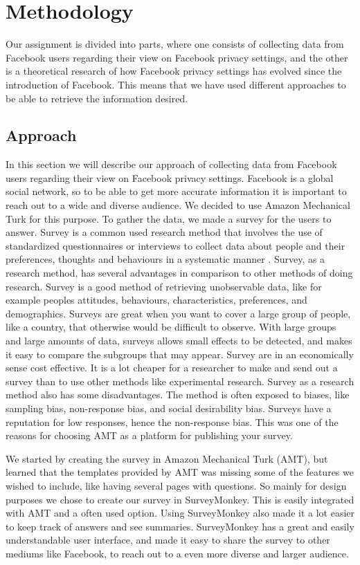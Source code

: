 \chapter{Methodology}
\label{chp:relatedwork} 

Our assignment is divided into parts, where one consists of collecting data from Facebook users regarding their view on Facebook privacy settings, and the other is a theoretical research of how Facebook privacy settings has evolved since the introduction of Facebook. This means that we have used different approaches to be able to retrieve the information desired.

\section{Approach}
In this section we will describe our approach of collecting data from Facebook users regarding their view on Facebook privacy settings. Facebook is a global social network, so to be able to get more accurate information it is important to reach out to a wide and diverse audience. We decided to use Amazon Mechanical Turk for this purpose. To gather the data, we made a survey for the users to answer. Survey is a common used research method that involves the use of standardized questionnaires or interviews to collect data about people and their preferences, thoughts and behaviours in a systematic manner \cite{survey}. Survey, as a research method, has several advantages in comparison to other methods of doing research. Survey is a good method of retrieving unobservable data, like for example peoples attitudes, behaviours, characteristics, preferences, and demographics. Surveys are great when you want to cover a large group of people, like a country, that otherwise would be difficult to observe. With large groups and large amounts of data, surveys allows small effects to be detected, and makes it easy to compare the subgroups that may appear. Survey are in an economically sense cost effective. It is a lot cheaper for a researcher to make and send out a survey than to use other methods like experimental research. Survey as a research method also has some disadvantages. The method is often exposed to biases, like sampling bias, non-response bias, and social desirability bias. Surveys have a reputation for low responses, hence the non-response bias. This was one of the reasons for choosing AMT as a platform for publishing your survey. 

We started by creating the survey in Amazon Mechanical Turk (AMT), but learned that the templates provided by AMT was missing some of the features we wished to include, like having several pages with questions. So mainly for design purposes we chose to create our survey in SurveyMonkey. This is easily integrated with AMT and a often used option.  Using SurveyMonkey also made it a lot easier to keep track of answers and see summaries. SurveyMonkey has a great and easily understandable user interface, and made it easy to share the survey to other mediums like Facebook, to reach out to a even more diverse and larger audience. 

